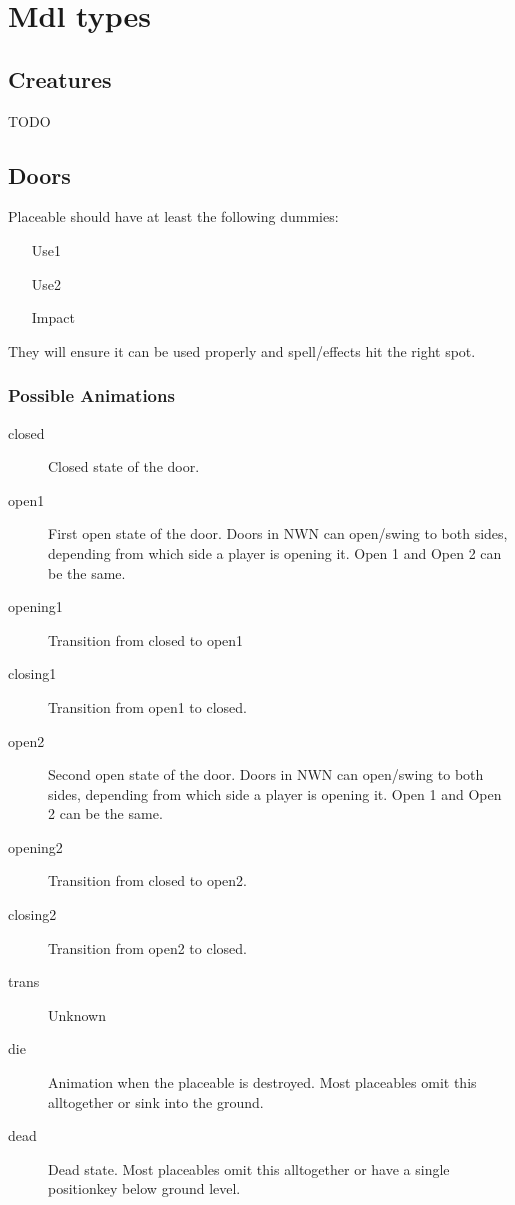 \section{Mdl types}

\subsection{Creatures}
TODO

\subsection{Doors}
Placeable should have at least the following dummies:
\begin{itemize}
    \item[Use1]
    \item[Use2]
    \item[Impact]
\end{itemize}
They will ensure it can be used properly and spell/effects hit the right spot.

\subsubsection*{Possible Animations}
\begin{description}
    \item[closed] Closed state of the door.
    \item[open1] First open state of the door. Doors in NWN can open/swing to both sides, depending from which side a player is opening it. Open 1 and Open 2 can be the same.
    \item[opening1] Transition from closed to open1
    \item[closing1] Transition from open1 to closed.
    \item[open2] Second open state of the door. Doors in NWN can open/swing to both sides, depending from which side a player is opening it. Open 1 and Open 2 can be the same.
    \item[opening2] Transition from closed to open2.
    \item[closing2] Transition from open2 to closed.
    \item[trans] Unknown
    \item[die] Animation when the placeable is destroyed. Most placeables omit this alltogether or sink into the ground.
    \item[dead] Dead state. Most placeables omit this alltogether or have a single positionkey below ground level.
\end{description}

